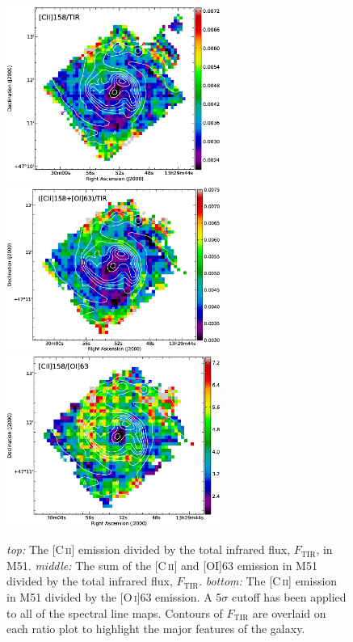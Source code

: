 \documentclass[preprint2]{aastex}
\begin{document}
\begin{figure}
\includegraphics[width=7.0cm]{Figure3a}
\includegraphics[width=7.0cm]{Figure3b}
\includegraphics[width=7.0cm]{Figure3c}
\caption{\emph{top:} The [C\,\textsc{ii}] emission divided by the total infrared flux, $F_{\mathrm{TIR}}$, in M51.  \emph{middle: }The sum of the [C\,\textsc{ii}] and [OI]63 emission in M51 divided by the total infrared flux, $F_{\mathrm{TIR}}$.  \emph{bottom:} The [C\,\textsc{ii}] emission in M51 divided by the [O\,\textsc{i}]63 emission.  A 5$\sigma$ cutoff has been applied to all of the spectral line maps.  Contours of $F_{\mathrm{TIR}}$ are overlaid on each ratio plot to highlight the major features of the galaxy.}
\label{fig:ratio_plots}
\end{figure}
\end{document}
